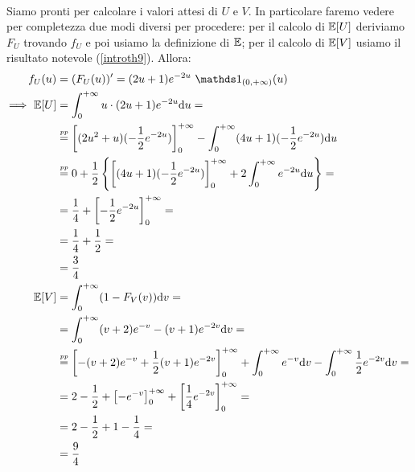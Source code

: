 \begin{enumerate}
\begin{gather*}
\end{gather*}
Siamo pronti per calcolare i valori attesi di $U$ e $V$. In particolare faremo vedere per completezza due modi diversi per procedere: per il calcolo di $\mathbb{E}[U]$ deriviamo $F_U$ trovando $f_U$ e poi usiamo la definizione di $\mathbb{E}$; per il calcolo di $\mathbb{E}[V]$ usiamo il risultato notevole (\ref{introth9}). Allora:
\begin{gather*}
\begin{aligned}
f_U(u)&=(F_U(u))'=(2u+1)e^{-2u}\ \Ind_{(0,+\infty)}(u) \\
\Longrightarrow\ \EE[U]&=\intc u\cdot (2u+1)e^{-2u}\du =\\
&\overset{\underset{pp}{}}{=}\left[(2u^2+u)(-\frac{1}{2}e^{-2u})   \right]_0^{+\infty} -\intc (4u+1)(-\frac{1}{2}e^{-2u})\du \\
&\overset{\underset{pp}{}}{=}0+\frac{1}{2}\left\{\left[(4u+1)(-\frac{1}{2}e^{-2u})  \right]_0^{+\infty}+2\intc e^{-2u}\du   \right\}=\\
&=\frac{1}{4}+\left[ -\frac{1}{2}e^{-2u} \right]_0^{+\infty}=\\
&=\frac{1}{4}+\frac{1}{2}=\\
&=\frac{3}{4} \\
\EE[V]&=\intc (1-F_V(v))\dv=\\
&=\intc (v+2)e^{-v}-(v+1)e^{-2v}\dv=\\
&\overset{\underset{pp}{}}{=}\left[-(v+2)e^{-v}+\frac{1}{2}(v+1)e^{-2v}  \right]_0^{+\infty}+\intc e^{-v}\dv-\intc \frac{1}{2}e^{-2v}\dv=\\
&=2-\frac{1}{2}+\left[-e^{-v}  \right]_0^{+\infty}  + \left[\frac{1}{4}e^{-2v}  \right]_0^{+\infty}=\\
&=2-\frac{1}{2}+1-\frac{1}{4}=\\
&=\frac{9}{4}
\end{aligned}
\end{gather*}
\end{enumerate}

